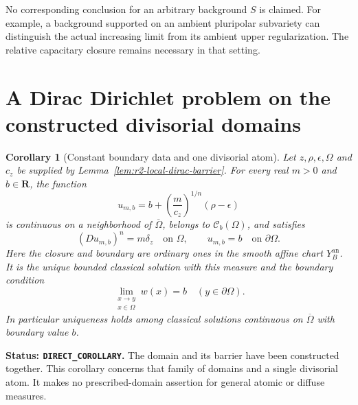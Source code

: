 \documentclass[11pt,a4paper]{article}
\numberwithin{equation}{section}
\newtheorem{corollary}[theorem]{Corollary}
\theoremstyle{definition}
\theoremstyle{remark}
\newcommand{\Cb}{\mathcal C_b}
\newcommand{\an}{\mathrm{an}}
\begin{document}
No corresponding conclusion for an arbitrary background $S$
is claimed. For example, a background supported on an ambient
pluripolar subvariety can distinguish the actual increasing
limit from its ambient upper regularization. The relative
capacitary closure remains necessary in that setting.



\section{A Dirac Dirichlet problem on the constructed divisorial domains}
\label{sec:r2-dirac-dirichlet}

\begin{corollary}[Constant boundary data and one divisorial atom]
\label{cor:r2-dirac-dirichlet}
Let $z,\rho,\epsilon,\Omega$ and $c_z$ be supplied by
Lemma~\ref{lem:r2-local-dirac-barrier}. For every real
$m>0$ and $b\in\mathbf R$, the function
\[
 u_{m,b}=b+\left(\frac m{c_z}\right)^{1/n}
                         (\rho-\epsilon)
\]
is continuous on a neighborhood of $\overline\Omega$,
belongs to $\Cb(\Omega)$, and satisfies
\[
 (Du_{m,b})^n=m\delta_z\quad\text{on }\Omega,
 \qquad u_{m,b}=b\quad\text{on }\partial\Omega.
\]
Here the closure and boundary are ordinary ones in the smooth
affine chart $Y_B^{\an}$. It is the unique bounded classical
solution with this measure and the boundary condition
\[
 \lim_{\substack{x\to y\\x\in\Omega}}w(x)=b
                   \quad(y\in\partial\Omega).
\]
In particular uniqueness holds among classical solutions
continuous on $\overline\Omega$ with boundary value $b$.
\end{corollary}

\noindent\textbf{Status: \texttt{DIRECT\_COROLLARY}.}
The domain and its barrier have been constructed together.
This corollary concerns that family of domains and a single
divisorial atom. It makes no prescribed-domain assertion for
general atomic or diffuse measures.
\end{document}
